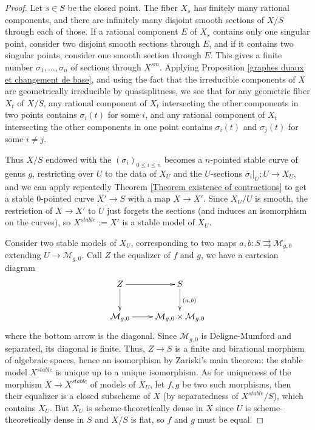 \documentclass[a4paper,10pt,twoside]{article}
\newcommand{\ra}{\rightarrow}
\theoremstyle{definition}
\theoremstyle{remark}
\newcommand{\ca}[1]{{\mathcal{#1}}}
\begin{document}
\begin{proof}
Let $s\in S$ be the closed point. The fiber $X_s$ has finitely many rational components, and there are infinitely many disjoint smooth sections of $X/S$ through each of those. If a rational component $E$ of $X_s$ contains only one singular point, consider two disjoint smooth sections through $E$, and if it contains two singular points, consider one smooth section through $E$. This gives a finite number $\sigma_1,...,\sigma_n$ of sections through $X^{sm}$. Applying Proposition \ref{graphes duaux et changement de base}, and using the fact that the irreducible components of $X$ are geometrically irreducible by quasisplitness, we see that for any geometric fiber $X_t$ of $X/S$, any rational component of $X_t$ intersecting the other components in two points contains $\sigma_i(t)$ for some $i$, and any rational component of $X_t$ intersecting the other components in one point contains $\sigma_i(t)$ and $\sigma_j(t)$ for some $i\neq j$.

Thus $X/S$ endowed with the $(\sigma_i)_{0\leq i\leq n}$ becomes a $n$-pointed stable curve of genus $g$, restricting over $U$ to the data of $X_U$ and the $U$-sections $\sigma_i|_U:U\ra X_U$, and we can apply repeatedly Theorem \ref{Theorem existence of contractions} to get a stable $0$-pointed curve $X'\ra S$ with a map $X\ra X'$. Since $X_U/U$ is smooth, the restriction of $X\ra X'$ to $U$ just forgets the sections (and induces an isomorphism on the curves), so $X^{stable}:=X'$ is a stable model of $X_U$.

Consider two stable models of $X_U$, corresponding to two maps $a,b \colon S \rightrightarrows \ca M_{g,0}$ extending $U \to \ca M_{g,0}$. Call $Z$ the equalizer of $f$ and $g$, we have a cartesian diagram
\[
\xymatrix{
Z\ar[r]\ar[d] & S \ar[d]^{(a,b)} \\
\ca M_{g,0} \ar[r] & \ca M_{g,0} \times \ca M_{g,0}
}
\]
where the bottom arrow is the diagonal. Since $\mathcal{M}_{g,0}$ is Deligne-Mumford and separated, its diagonal is finite. Thus, $Z \to S$ is a finite and birational morphism of algebraic spaces, hence an isomorphism by Zariski's main theorem: the stable model $X^{stable}$ is unique up to a unique isomorphism. As for uniqueness of the morphism $X\ra X^{stable}$ of models of $X_U$, let $f,g$ be two such morphisms, then their equalizer is a closed subscheme of $X$ (by separatedness of $X^{stable}/S$), which contains $X_U$. But $X_U$ is scheme-theoretically dense in $X$ since $U$ is scheme-theoretically dense in $S$ and $X/S$ is flat, so $f$ and $g$ must be equal.
\end{proof}
\end{document}
